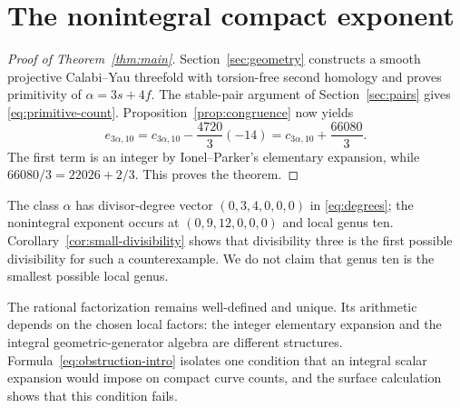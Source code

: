 \section{The nonintegral compact exponent}

\begin{proof}[Proof of Theorem~\ref{thm:main}]
Section~\ref{sec:geometry} constructs a smooth projective
Calabi--Yau threefold with torsion-free second homology and proves
primitivity of $\alpha=3s+4f$. The stable-pair argument of
Section~\ref{sec:pairs} gives \eqref{eq:primitive-count}.
Proposition~\ref{prop:congruence} now yields
\[
 e_{3\alpha,10}
 =c_{3\alpha,10}-\frac{4720}{3}(-14)
 =c_{3\alpha,10}+\frac{66080}{3}.
\]
The first term is an integer by Ionel--Parker's elementary
expansion, while $66080/3=22026+2/3$. This proves the theorem.
\end{proof}

The class $\alpha$ has divisor-degree vector
$(0,3,4,0,0,0)$ in \eqref{eq:degrees}; the nonintegral exponent
occurs at $(0,9,12,0,0,0)$ and local genus ten.
Corollary~\ref{cor:small-divisibility} shows that divisibility three
is the first possible divisibility for such a counterexample.
We do not claim that genus ten is the smallest possible local genus.

The rational factorization remains well-defined and unique.
Its arithmetic depends on the chosen local factors: the integer
elementary expansion and the integral geometric-generator algebra
are different structures. Formula~\eqref{eq:obstruction-intro}
isolates one condition that an integral scalar expansion would
impose on compact curve counts, and the surface calculation shows
that this condition fails.

